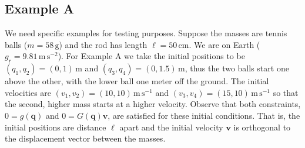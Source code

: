 \documentclass[letterpaper,final,12pt,reqno]{amsart}
\newcommand{\bq}{\mathbf{q}}
\newcommand{\bv}{\mathbf{v}}
\begin{document}
\subsection*{Example A} We need specific examples for testing purposes.  Suppose the masses are tennis balls ($m=58\,\text{g}$) and the rod has length $\ell=50\,\text{cm}$.  We are on Earth ($g_r=9.81\,\text{m}\,\text{s}^{-2}$).  For Example A we take the initial positions to be $(q_1,q_2)=(0,1)\,\text{m}$ and $(q_3,q_4)=(0,1.5)\,\text{m}$, thus the two balls start one above the other, with the lower ball one meter off the ground.  The initial velocities are $(v_1,v_2)=(10,10)\,\text{m}\,\text{s}^{-1}$ and $(v_3,v_4)=(15,10)\,\text{m}\,\text{s}^{-1}$ so that the second, higher mass starts at a higher velocity.  Observe that both constraints, $0=g(\bq)$ and $0=G(\bq)\bv$, are satisfied for these initial conditions.  That is, the initial positions are distance $\ell$ apart and the initial velocity $\bv$ is orthogonal to the displacement vector between the masses.
\end{document}
